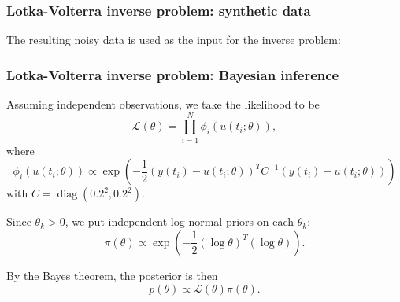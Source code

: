 \documentclass{beamer}
\DeclareMathOperator{\diag}{diag}
\begin{document}
\begin{frame}
\frametitle{Lotka-Volterra inverse problem: synthetic data}

The resulting noisy data is used as the input for the inverse problem:

\begin{figure}[h]
\centering
{}
\end{figure}

\end{frame}



\begin{frame}
\frametitle{Lotka-Volterra inverse problem: Bayesian inference}

Assuming independent observations, we take the likelihood to be
\begin{equation*}
\mathcal{L}(\theta) = \prod_{i=1}^N \phi_i(u(t_i; \theta)),
\end{equation*}
where 
\begin{equation*}
\phi_i(u(t_i;\theta)) \propto \exp\left( -\frac{1}{2} (y(t_i) - u(t_i; \theta))^T C^{-1} (y(t_i) - u(t_i; \theta)) \right)
\end{equation*}
with $C = \diag(0.2^2, 0.2^2)$.

Since $\theta_k > 0$, we put independent log-normal priors on each $\theta_k$:
\begin{equation*}
\pi(\theta) \propto \exp \left(-\frac{1}{2} (\log \theta)^T (\log \theta) \right).
\end{equation*}

By the Bayes theorem, the posterior is then
\begin{equation*}
p(\theta) \propto \mathcal{L}(\theta) \pi(\theta).
\end{equation*}

\end{frame}
\end{document}
